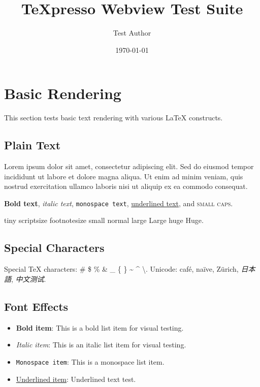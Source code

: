 \documentclass[12pt,a4paper]{article}
\title{TeXpresso Webview Test Suite}
\author{Test Author}
\date{\today}
\begin{document}
\maketitle
\tableofcontents
\newpage

\section{Basic Rendering}

This section tests basic text rendering with various LaTeX constructs.

\subsection{Plain Text}

Lorem ipsum dolor sit amet, consectetur adipiscing elit. Sed do eiusmod tempor
incididunt ut labore et dolore magna aliqua. Ut enim ad minim veniam, quis
nostrud exercitation ullamco laboris nisi ut aliquip ex ea commodo consequat.

\textbf{Bold text}, \textit{italic text}, \texttt{monospace text},
\underline{underlined text}, and \textsc{small caps}.

{\tiny tiny} {\scriptsize scriptsize} {\footnotesize footnotesize}
{\small small} {\normalsize normal} {\large large} {\Large Large}
{\huge huge} {\Huge Huge}.

\subsection{Special Characters}

Special TeX characters: \# \$ \% \& \_ \{ \} \~{} \^{} \textbackslash.
Unicode: café, naïve, Zürich, \emph{日本語}, \emph{中文测试}.

\subsection{Font Effects}

\begin{itemize}
  \item \textbf{Bold item}: This is a bold list item for visual testing.
  \item \textit{Italic item}: This is an italic list item for visual testing.
  \item \texttt{Monospace item}: This is a monospace list item.
  \item \underline{Underlined item}: Underlined text test.
\end{itemize}
\end{document}
